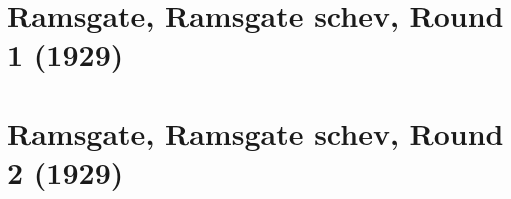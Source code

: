 \documentclass[11pt]{article}
\begin{document}


\clearpage



\clearpage



\clearpage



\clearpage



\clearpage



\clearpage



\clearpage



\clearpage



\clearpage



\clearpage



\clearpage



\clearpage



\clearpage



\clearpage



\clearpage



\clearpage



\clearpage

\section{Ramsgate, Ramsgate schev, Round 1 (1929)}


\clearpage

\section{Ramsgate, Ramsgate schev, Round 2 (1929)}


\clearpage
\end{document}
